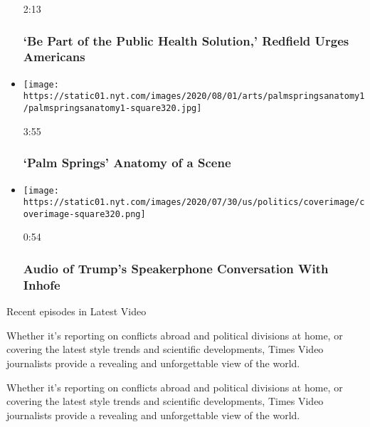 \begin{itemize}
  2:13

  \hypertarget{be-part-of-the-public-health-solution-redfield-urges-americans}{%
  \subsubsection{`Be Part of the Public Health Solution,' Redfield Urges
  Americans}\label{be-part-of-the-public-health-solution-redfield-urges-americans}}
\item
  \href{https://www.nytimes.com/video/movies/100000007265338/palm-springs-scene.html?action=click\&module=video-series-bar\&region=header\&pgtype=Article\&playlistId=video/latest-video}{}

  \texttt{[image: https://static01.nyt.com/images/2020/08/01/arts/palmspringsanatomy1/palmspringsanatomy1-square320.jpg]}

  3:55

  \hypertarget{palm-springs--anatomy-of-a-scene}{%
  \subsubsection{`Palm Springs' \textbar{} Anatomy of a
  Scene}\label{palm-springs--anatomy-of-a-scene}}
\item
  \href{https://www.nytimes.com/video/us/politics/100000007265038/trump-inhofe-audio-call.html?action=click\&module=video-series-bar\&region=header\&pgtype=Article\&playlistId=video/latest-video}{}

  \texttt{[image: https://static01.nyt.com/images/2020/07/30/us/politics/coverimage/coverimage-square320.png]}

  0:54

  \hypertarget{audio-of-trumps-speakerphone-conversation-with-inhofe}{%
  \subsubsection{Audio of Trump's Speakerphone Conversation With
  Inhofe}\label{audio-of-trumps-speakerphone-conversation-with-inhofe}}
\end{itemize}

Recent episodes in Latest Video

Whether it's reporting on conflicts abroad and political divisions at
home, or covering the latest style trends and scientific developments,
Times Video journalists provide a revealing and unforgettable view of
the world.

Whether it's reporting on conflicts abroad and political divisions at
home, or covering the latest style trends and scientific developments,
Times Video journalists provide a revealing and unforgettable view of
the world.

